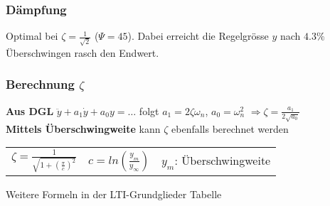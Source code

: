 \subsubsection{Dämpfung}
Optimal bei $\zeta=\frac{1}{\sqrt{2}}$ ($\Psi=45$).
Dabei erreicht die Regelgrösse $y$ nach $4.3\%$ Überschwingen rasch den	Endwert.

\subsubsection{Berechnung $\zeta$}
\textbf{Aus DGL} $\ddot{y}+a_1\dot{y}+a_0 y=\ldots$ folgt $a_1=2\zeta\omega_n$, 
$a_0=\omega_n^2$
$\Rightarrow \zeta=\frac{a_1}{2\sqrt{a_0}}$ \\
\textbf{Mittels Überschwingweite} kann $\zeta$ ebenfalls berechnet werden\\
\begin{tabular}{p{2.5cm}p{2.5cm}p{4cm}}
$\zeta = \frac{1}{\sqrt{1+(\frac{\pi}{c})^2}}$ & $c =ln(\frac{y_m}{y_{\infty}})$ & $y_m$: Überschwingweite
\end{tabular}

Weitere Formeln in der LTI-Grundglieder Tabelle

